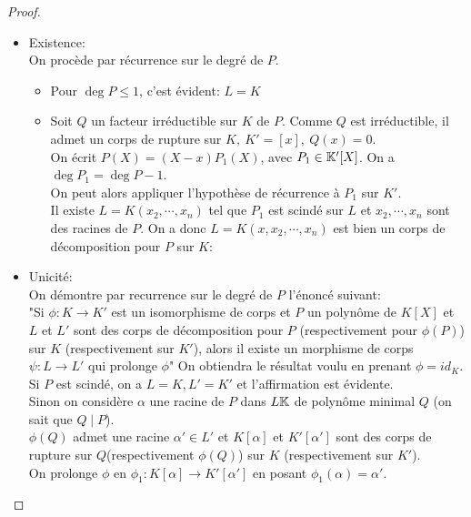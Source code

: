 \begin{proof}
	\begin{itemize}
		\item Existence:\\
		      On procède par récurrence sur le degré de $P$.
		      \begin{itemize}
			      \item Pour $\deg P \leq 1$, c'est évident: $L = K$
			      \item Soit $Q$ un facteur irréductible sur $K$ de $P$.
			            Comme $Q$ est irréductible, il admet un corps de rupture sur $K, \ K' = [x], \ Q(x) = 0$.\\
			            On écrit $P(X) = (X-x)P_1(X)$, avec $P_1 \in \mathbb{K}'[X]$. On a $\deg P_1 = \deg P -1$.\\
			            On peut alors appliquer l'hypothèse de récurrence à $P_1$ sur $K'$.\\
			            Il existe $L = K(x_2, \cdots,  x_n)$ tel que $P_1$ est scindé sur $L$ et
			            $x_2, \cdots, x_n$ sont des racines de $P$. On a donc $L = K(x, x_2, \cdots, x_n)$ est bien un
			            corps de décomposition pour $P$ sur $K$:
		      \end{itemize}
		\item Unicité:\\
		      On démontre par recurrence sur le degré de $P$ l'énoncé suivant:\\
		      "Si $\phi : K \to K'$ est un isomorphisme de corps et $P$ un polynôme de $K[X]$ et $L$ et $L'$
		      sont des corps de décomposition pour $P$ (respectivement pour $\phi(P)$) sur $K$ (respectivement sur $K'$),
		      alors il existe un morphisme de corps $\psi: L \to L'$ qui prolonge $\phi$"
		      On obtiendra le résultat voulu en prenant $\phi = id_K$.\\

		      Si $P$ est scindé, on a $L=K, L'=K'$ et l'affirmation est évidente.\\

		      Sinon on considère $\alpha$ une racine de $P$ dans $L\mathbb{K}$ de polynôme minimal $Q$ (on sait que $Q \mid P$).\\
		      $\phi (Q)$ admet une racine $\alpha' \in L'$ et $K[\alpha]$ et $K'[\alpha']$ sont des corps de rupture sur $Q$(respectivement $\phi(Q)$)
		      sur $K$ (respectivement sur $K'$).\\

		      On prolonge $\phi$ en $\phi_1 : K[\alpha] \to K'[\alpha']$ en posant $\phi_1(\alpha) = \alpha'$.\\


\end{itemize}
\end{proof}
